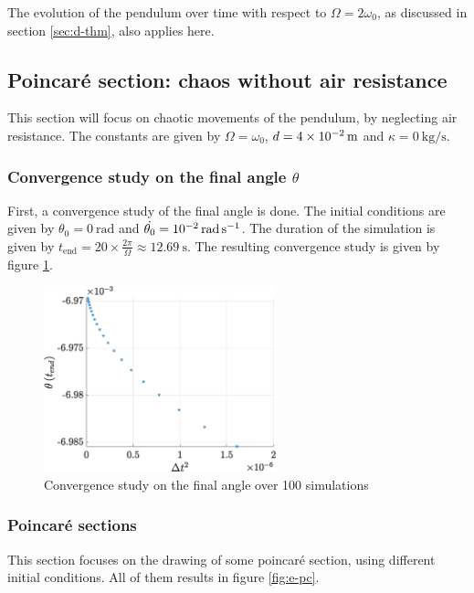 \documentclass[a4paper,12pt,twoside]{article}
\begin{document}
The evolution of the pendulum over time with respect to $\Omega=2\omega_0$, as discussed in section \ref{sec:d-thm}, also applies here.


\subsection{Poincaré section: chaos without air resistance}
This section will focus on chaotic movements of the pendulum, by neglecting air resistance.
The constants are given by $\Omega = \omega_0$, $d=\SI{4d-2}{\m}$ and $\kappa=\SI{0}{\kg\per\s}$.

\subsubsection{Convergence study on the final angle $\theta$}
First, a convergence study of the final angle is done.
The initial conditions are given by $\theta_0=\SI{0}{\radian}$ and $\dot{\theta_0}=\SI{d-2}{\radian\per\second}$.
The duration of the simulation is given by $t_\text{end} = 20\times\frac{2\pi}{\Omega} \approx \SI{12.69}{\s}$.
The resulting convergence study is given by figure \ref{fig:e-conv}.

\begin{figure}[h]
	\centering
	\includegraphics[width=0.6\textwidth]{graphs/e_conv.eps}
	\caption{Convergence study on the final angle over \num{100} simulations} %
	\label{fig:e-conv}
\end{figure}


\subsubsection{Poincaré sections}
This section focuses on the drawing of some poincaré section, using different initial conditions.
All of them results in figure \ref{fig:e-pc}.
\end{document}
